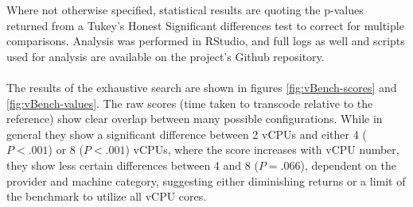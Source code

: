 \documentclass{article}
\begin{document}
Where not otherwise specified, statistical results are quoting the p-values returned from a Tukey's Honest Significant differences test to correct for multiple comparisons. Analysis was performed in RStudio\cite{R, RStudio}, and full logs as well and scripts used for analysis are available on the project's Github repository.

\paragraph{}
The results of the exhaustive search are shown in figures \ref{fig:vBench-scores} and \ref{fig:vBench-values}. The raw scores (time taken to transcode relative to the reference) show clear overlap between many possible configurations. While in general they show a significant difference between 2 vCPUs and either 4 ($P < .001$) or 8 ($P < .001$) vCPUs, where the score increases with vCPU number, they show less certain differences between 4 and 8 ($P = .066$), dependent on the provider and machine category, suggesting either diminishing returns or a limit of the benchmark to utilize all vCPU cores.
 
\end{document}
